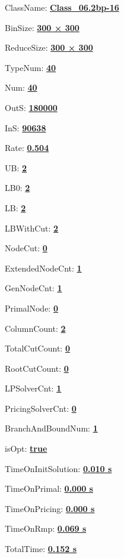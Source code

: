 \documentclass[11pt]{article}
\begin{document}
\pagestyle{empty}


ClassName: \underline{\textbf{Class_06.2bp-16}}
\par
BinSize: \underline{\textbf{300 × 300}}
\par
ReduceSize: \underline{\textbf{300 × 300}}
\par
TypeNum: \underline{\textbf{40}}
\par
Num: \underline{\textbf{40}}
\par
OutS: \underline{\textbf{180000}}
\par
InS: \underline{\textbf{90638}}
\par
Rate: \underline{\textbf{0.504}}
\par
UB: \underline{\textbf{2}}
\par
LB0: \underline{\textbf{2}}
\par
LB: \underline{\textbf{2}}
\par
LBWithCut: \underline{\textbf{2}}
\par
NodeCut: \underline{\textbf{0}}
\par
ExtendedNodeCnt: \underline{\textbf{1}}
\par
GenNodeCnt: \underline{\textbf{1}}
\par
PrimalNode: \underline{\textbf{0}}
\par
ColumnCount: \underline{\textbf{2}}
\par
TotalCutCount: \underline{\textbf{0}}
\par
RootCutCount: \underline{\textbf{0}}
\par
LPSolverCnt: \underline{\textbf{1}}
\par
PricingSolverCnt: \underline{\textbf{0}}
\par
BranchAndBoundNum: \underline{\textbf{1}}
\par
isOpt: \underline{\textbf{true}}
\par
TimeOnInitSolution: \underline{\textbf{0.010 s}}
\par
TimeOnPrimal: \underline{\textbf{0.000 s}}
\par
TimeOnPricing: \underline{\textbf{0.000 s}}
\par
TimeOnRmp: \underline{\textbf{0.069 s}}
\par
TotalTime: \underline{\textbf{0.152 s}}
\par
\newpage
\end{document}
